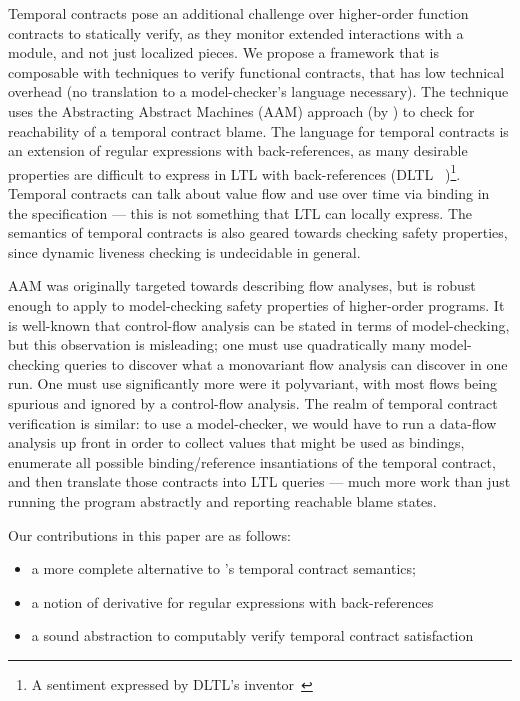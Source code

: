 Temporal contracts pose an additional challenge over higher-order function contracts to statically verify, as they monitor extended interactions with a module, and not just localized pieces.
%
We propose a framework that is composable with techniques to verify functional contracts, that has low technical overhead (\eg no translation to a model-checker's language necessary).
%
The technique uses the Abstracting Abstract Machines (AAM) approach (by \citet{dvanhorn:VanHorn2010Abstracting}) to check for reachability of a temporal contract blame.
%
The language for temporal contracts is an extension of regular expressions with back-references, as many desirable properties are difficult to express in LTL with back-references (DLTL ~\cite{ianjohnson:jlo})\footnote{A sentiment expressed by DLTL's inventor~\citep{boddenadmission}}.
%
Temporal contracts can talk about value flow and use over time via binding in the specification --- this is not something that LTL can locally express.
%
The semantics of temporal contracts is also geared towards checking safety properties, since dynamic liveness checking is undecidable in general.

AAM was originally targeted towards describing flow analyses, but is robust enough to apply to model-checking safety properties of higher-order programs.
%
It is well-known that control-flow analysis can be stated in terms of model-checking, but this observation is misleading; one must use quadratically many model-checking queries to discover what a monovariant flow analysis can discover in one run.
%
One must use significantly more were it polyvariant, with most flows being spurious and ignored by a control-flow analysis.
%
The realm of temporal contract verification is similar: to use a model-checker, we would have to run a data-flow analysis up front in order to collect values that might be used as bindings, enumerate all possible binding/reference insantiations of the temporal contract, and then translate those contracts into LTL queries --- much more work than just running the program abstractly and reporting reachable blame states.
%

Our contributions in this paper are as follows:
\begin{itemize}
 \item{a more complete alternative to \citeauthor{ianjohnson:dfm:icfp2011}'s temporal contract semantics;}
 \item{a notion of derivative for regular expressions with back-references}
 \item{a sound abstraction to computably verify temporal contract satisfaction}
\end{itemize}

